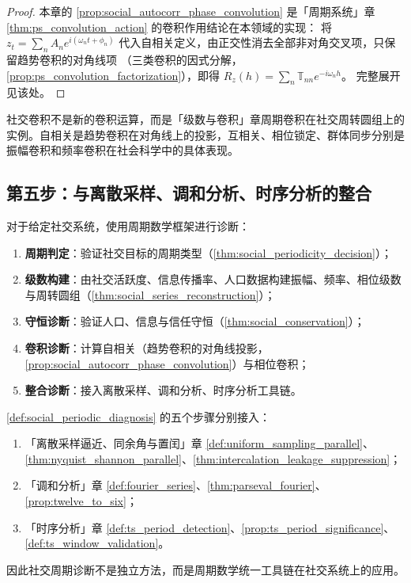 \begin{proof}
本章的 \cref{prop:social_autocorr_phase_convolution} 是「周期系统」章 \cref{thm:ps_convolution_action} 的卷积作用结论在本领域的实现：
将 $z_t=\sum_n A_n e^{i(\omega_n t+\phi_n)}$ 代入自相关定义，由正交性消去全部非对角交叉项，只保留趋势卷积的对角线项
（三类卷积的因式分解，\cref{prop:ps_convolution_factorization}），即得 $R_z(h)=\sum_n\mathbb T_{nn}e^{-i\omega_n h}$。
完整展开见该处。
\end{proof}

\begin{remark}[社交卷积与周期卷积的关系]\label{rem:social_convolution_relation}
社交卷积不是新的卷积运算，而是「级数与卷积」章周期卷积在社交周转圆组上的实例。自相关是趋势卷积在对角线上的投影，互相关、相位锁定、群体同步分别是振幅卷积和频率卷积在社会科学中的具体表现。
\end{remark}

\subsection{第五步：与离散采样、调和分析、时序分析的整合}

\begin{definition}[社交周期诊断流程]\label{def:social_periodic_diagnosis}
对于给定社交系统，使用周期数学框架进行诊断：
\begin{enumerate}[label=(\roman*)]
    \item \textbf{周期判定}：验证社交目标的周期类型（\cref{thm:social_periodicity_decision}）；
    \item \textbf{级数构建}：由社交活跃度、信息传播率、人口数据构建振幅、频率、相位级数与周转圆组（\cref{thm:social_series_reconstruction}）；
    \item \textbf{守恒诊断}：验证人口、信息与信任守恒（\cref{thm:social_conservation}）；
    \item \textbf{卷积诊断}：计算自相关（趋势卷积的对角线投影，\cref{prop:social_autocorr_phase_convolution}）与相位卷积；
    \item \textbf{整合诊断}：接入离散采样、调和分析、时序分析工具链。
\end{enumerate}
\end{definition}

\begin{theorem}[社交周期诊断流程与三章接口]\label{thm:social_diagnosis_integration}
\cref{def:social_periodic_diagnosis} 的五个步骤分别接入：
\begin{enumerate}[label=(\roman*)]
    \item 「离散采样逼近、同余角与置闰」章 \cref{def:uniform_sampling_parallel}、\cref{thm:nyquist_shannon_parallel}、\cref{thm:intercalation_leakage_suppression}；
    \item 「调和分析」章 \cref{def:fourier_series}、\cref{thm:parseval_fourier}、\cref{prop:twelve_to_six}；
    \item 「时序分析」章 \cref{def:ts_period_detection}、\cref{prop:ts_period_significance}、\cref{def:ts_window_validation}。
\end{enumerate}
因此社交周期诊断不是独立方法，而是周期数学统一工具链在社交系统上的应用。
\end{theorem}

